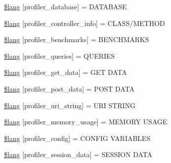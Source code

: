 \begin{DoxyCompactItemize}
\item 
\mbox{\hyperlink{profiler__lang_8php_a0e6ca63f05667222cdd21d238c40671b}{\$lang}} \mbox{[}\textquotesingle{}profiler\+\_\+database\textquotesingle{}\mbox{]} = \textquotesingle{}D\+A\+T\+A\+B\+A\+SE\textquotesingle{}
\item 
\mbox{\hyperlink{profiler__lang_8php_a570f8e02263bcc3d1baaac2e83bd9863}{\$lang}} \mbox{[}\textquotesingle{}profiler\+\_\+controller\+\_\+info\textquotesingle{}\mbox{]} = \textquotesingle{}C\+L\+A\+SS/M\+E\+T\+H\+OD\textquotesingle{}
\item 
\mbox{\hyperlink{profiler__lang_8php_a43df5e5b3666cfdcf0289ce6a9a78099}{\$lang}} \mbox{[}\textquotesingle{}profiler\+\_\+benchmarks\textquotesingle{}\mbox{]} = \textquotesingle{}B\+E\+N\+C\+H\+M\+A\+R\+KS\textquotesingle{}
\item 
\mbox{\hyperlink{profiler__lang_8php_a8ce1867179a75fc03294c0daf4fd1936}{\$lang}} \mbox{[}\textquotesingle{}profiler\+\_\+queries\textquotesingle{}\mbox{]} = \textquotesingle{}Q\+U\+E\+R\+I\+ES\textquotesingle{}
\item 
\mbox{\hyperlink{profiler__lang_8php_ae1ccbfaf8b047b3b3d70a0f8186c5cc6}{\$lang}} \mbox{[}\textquotesingle{}profiler\+\_\+get\+\_\+data\textquotesingle{}\mbox{]} = \textquotesingle{}G\+ET D\+A\+TA\textquotesingle{}
\item 
\mbox{\hyperlink{profiler__lang_8php_a9c5ac508141b22eb6364531c0a95b0a1}{\$lang}} \mbox{[}\textquotesingle{}profiler\+\_\+post\+\_\+data\textquotesingle{}\mbox{]} = \textquotesingle{}P\+O\+ST D\+A\+TA\textquotesingle{}
\item 
\mbox{\hyperlink{profiler__lang_8php_a319f7bcda8a7d5175ebc0d90e47bd1f0}{\$lang}} \mbox{[}\textquotesingle{}profiler\+\_\+uri\+\_\+string\textquotesingle{}\mbox{]} = \textquotesingle{}U\+RI S\+T\+R\+I\+NG\textquotesingle{}
\item 
\mbox{\hyperlink{profiler__lang_8php_afd17945cbf5c2c86dc685bd2e17b0f9b}{\$lang}} \mbox{[}\textquotesingle{}profiler\+\_\+memory\+\_\+usage\textquotesingle{}\mbox{]} = \textquotesingle{}M\+E\+M\+O\+RY U\+S\+A\+GE\textquotesingle{}
\item 
\mbox{\hyperlink{profiler__lang_8php_a72379fb9151c4d4d3bf61e8b15e6e643}{\$lang}} \mbox{[}\textquotesingle{}profiler\+\_\+config\textquotesingle{}\mbox{]} = \textquotesingle{}C\+O\+N\+F\+IG V\+A\+R\+I\+A\+B\+L\+ES\textquotesingle{}
\item 
\mbox{\hyperlink{profiler__lang_8php_a75e50cd81f9049c979e3d27d32e4d30a}{\$lang}} \mbox{[}\textquotesingle{}profiler\+\_\+session\+\_\+data\textquotesingle{}\mbox{]} = \textquotesingle{}S\+E\+S\+S\+I\+ON D\+A\+TA\textquotesingle{}

\end{DoxyCompactItemize}
